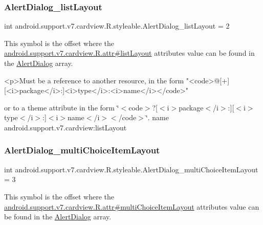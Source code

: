 \subsubsection{\texorpdfstring{Alert\+Dialog\+\_\+list\+Layout}{AlertDialog\_listLayout}}
{\footnotesize\ttfamily int android.\+support.\+v7.\+cardview.\+R.\+styleable.\+Alert\+Dialog\+\_\+list\+Layout = 2\hspace{0.3cm}{\ttfamily [static]}}

This symbol is the offset where the \hyperlink{classandroid_1_1support_1_1v7_1_1cardview_1_1R_1_1attr_a1180c355e7f55ee08b35f8f665cb9a6d}{android.\+support.\+v7.\+cardview.\+R.\+attr\#list\+Layout} attribute\textquotesingle{}s value can be found in the \hyperlink{classandroid_1_1support_1_1v7_1_1cardview_1_1R_1_1styleable_a44fc620801e3af4c8b4e7ef1fee84a2d}{Alert\+Dialog} array.

\begin{DoxyVerb}      <p>Must be a reference to another resource, in the form "<code>@[+][<i>package</i>:]<i>type</i>:<i>name</i></code>"
\end{DoxyVerb}
 or to a theme attribute in the form \char`\"{}$<$code$>$?\mbox{[}$<$i$>$package$<$/i$>$\+:\mbox{]}\mbox{[}$<$i$>$type$<$/i$>$\+:\mbox{]}$<$i$>$name$<$/i$>$$<$/code$>$\char`\"{}.  name android.\+support.\+v7.\+cardview\+:list\+Layout \mbox{\label{classandroid_1_1support_1_1v7_1_1cardview_1_1R_1_1styleable_a2921500337329d9f9f4df0f85b020689}} 
\subsubsection{\texorpdfstring{Alert\+Dialog\+\_\+multi\+Choice\+Item\+Layout}{AlertDialog\_multiChoiceItemLayout}}
{\footnotesize\ttfamily int android.\+support.\+v7.\+cardview.\+R.\+styleable.\+Alert\+Dialog\+\_\+multi\+Choice\+Item\+Layout = 3\hspace{0.3cm}{\ttfamily [static]}}

This symbol is the offset where the \hyperlink{classandroid_1_1support_1_1v7_1_1cardview_1_1R_1_1attr_ae83893129928ab526e6828c21bea9dff}{android.\+support.\+v7.\+cardview.\+R.\+attr\#multi\+Choice\+Item\+Layout} attribute\textquotesingle{}s value can be found in the \hyperlink{classandroid_1_1support_1_1v7_1_1cardview_1_1R_1_1styleable_a44fc620801e3af4c8b4e7ef1fee84a2d}{Alert\+Dialog} array.


